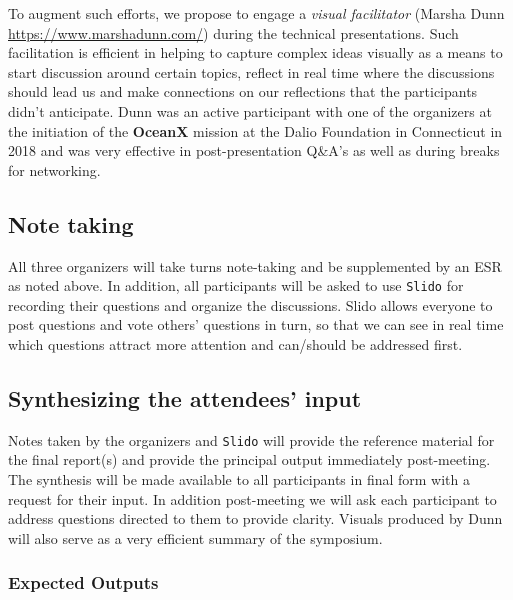 
To augment such efforts, we propose to engage a \emph{visual
  facilitator} (Marsha Dunn \url{https://www.marshadunn.com/}) during
the technical presentations. Such facilitation is efficient in helping
to capture complex ideas visually as a means to start discussion
around certain topics, reflect in real time where the discussions
should lead us and make connections on our reflections that the
participants didn't anticipate. Dunn was an active participant with
one of the organizers at the initiation of the \textbf{OceanX} mission
at the Dalio Foundation in Connecticut in 2018 and was very effective
in post-presentation Q\&A's as well as during breaks for networking.
 
\subsection{Note taking}

All three organizers will take turns note-taking and be supplemented by
an ESR as noted above. In addition, all participants will be asked to
use \texttt{Slido} for recording their questions and organize the
discussions. Slido allows everyone to post questions and vote others'
questions in turn, so that we can see in real time which questions
attract more attention and can/should be addressed first.
 
 
\subsection{Synthesizing the attendees’ input}

Notes taken by the organizers and \texttt{Slido} will provide the
reference material for the final report(s) and provide the principal
output immediately post-meeting. The synthesis will be made available to
all participants in final form with a request for their input. In
addition post-meeting we will ask each participant to address questions
directed to them to provide clarity. Visuals produced by Dunn will also
serve as a very efficient summary of the symposium.

 
\subsubsection{Expected Outputs}

